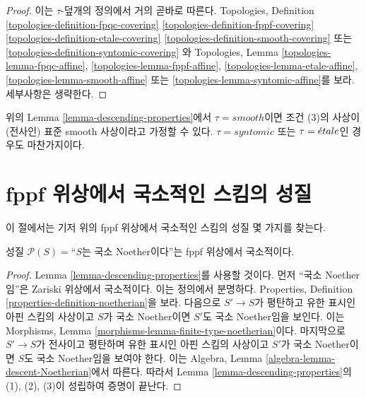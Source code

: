 \begin{proof}
이는 $\tau$-덮개의 정의에서 거의 곧바로 따른다. Topologies, Definition
\ref{topologies-definition-fpqc-covering}
\ref{topologies-definition-fppf-covering}
\ref{topologies-definition-etale-covering}
\ref{topologies-definition-smooth-covering} 또는
\ref{topologies-definition-syntomic-covering}
와 Topologies, Lemma
\ref{topologies-lemma-fpqc-affine},
\ref{topologies-lemma-fppf-affine},
\ref{topologies-lemma-etale-affine},
\ref{topologies-lemma-smooth-affine} 또는
\ref{topologies-lemma-syntomic-affine}를 보라. 세부사항은 생략한다.
\end{proof}

\begin{remark}
\label{remark-descending-properties-standard}
위의 Lemma \ref{lemma-descending-properties}에서 $\tau = smooth$이면 조건
(3)의 사상이 (전사인) 표준 smooth 사상이라고 가정할 수 있다.
$\tau = syntomic$ 또는 $\tau = {\acute{e}tale}$인 경우도 마찬가지이다.
\end{remark}





\section{fppf 위상에서 국소적인 스킴의 성질}
\label{section-descending-properties-fppf}

\noindent
이 절에서는 기저 위의 fppf 위상에서 국소적인 스킴의 성질 몇 가지를 찾는다.

\begin{lemma}
\label{lemma-Noetherian-local-fppf}
성질 $\mathcal{P}(S) =$``$S$는 국소 Noether이다''는 fppf 위상에서
국소적이다.
\end{lemma}

\begin{proof}
Lemma \ref{lemma-descending-properties}를 사용할 것이다. 먼저 ``국소
Noether임''은 Zariski 위상에서 국소적이다. 이는 정의에서 분명하다.
Properties, Definition \ref{properties-definition-noetherian}을 보라. 다음으로
$S' \to S$가 평탄하고 유한 표시인 아핀 스킴의 사상이고 $S$가 국소
Noether이면 $S'$도 국소 Noether임을 보인다. 이는 Morphisms, Lemma
\ref{morphisms-lemma-finite-type-noetherian}이다. 마지막으로 $S' \to S$가
전사이고 평탄하며 유한 표시인 아핀 스킴의 사상이고 $S'$가 국소
Noether이면 $S$도 국소 Noether임을 보여야 한다. 이는 Algebra, Lemma
\ref{algebra-lemma-descent-Noetherian}에서 따른다. 따라서 Lemma
\ref{lemma-descending-properties}의 (1), (2), (3)이 성립하여 증명이 끝난다.
\end{proof}

